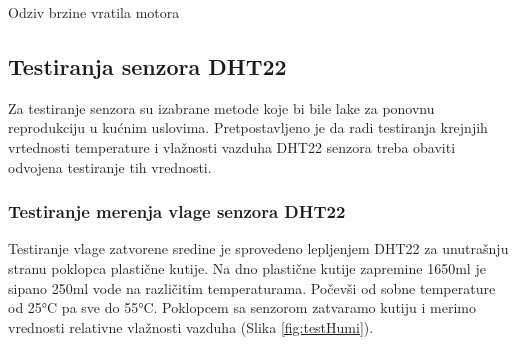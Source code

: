 \documentclass[a4paper, 12pt]{article}
\begin{document}
\vspace{10pt}

\begin{grafik}
\begin{center}
\end{center}			
\caption{Odziv brzine vratila motora}\label{grafiik:step_response}
\end{grafik}

\pagebreak


	\subsection{Testiranja senzora DHT22}
	
\vspace{10pt}

Za testiranje senzora su izabrane metode koje bi bile lake za ponovnu reprodukciju u kućnim uslovima. Pretpostavljeno je da radi testiranja krejnjih vrtednosti temperature i vlažnosti vazduha DHT22 senzora treba obaviti odvojena testiranje tih vrednosti. 

		\subsubsection*{Testiranje merenja vlage senzora DHT22}

\vspace{10pt}	
		
Testiranje vlage zatvorene sredine je sprovedeno lepljenjem DHT22 za unutrašnju stranu poklopca plastične kutije. Na dno plastične kutije zapremine 1650ml je sipano 250ml vode na različitim temperaturama. Počevši od sobne temperature od 25°C pa sve do 55°C. Poklopcem sa senzorom zatvaramo kutiju i merimo vrednosti relativne vlažnosti vazduha (Slika \ref{fig:testHumi}).
\end{document}
